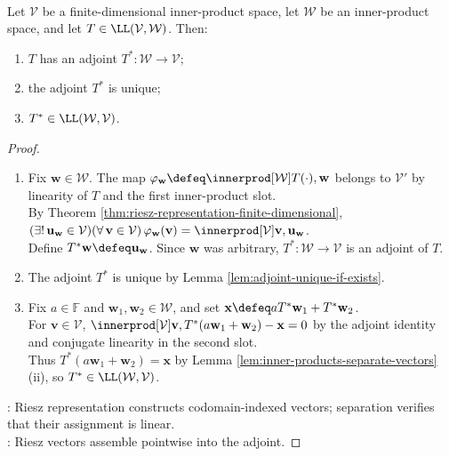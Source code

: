 \begin{theorem} \label{thm:finite-dimensional-adjoint-exists} \\
Let $\mathcal{V}$ be a finite-dimensional inner-product space, let $\mathcal{W}$ be an inner-product space, and let $T\in\LL(\mathcal{V},\mathcal{W})$. Then:
\begin{enumerate}[label=(\roman*)]
\setlength{\itemsep}{0pt}
\item $T$ has an adjoint $T^*:\mathcal{W}\to\mathcal{V}$;
\item the adjoint $T^*$ is unique;
\item $T^*\in\LL(\mathcal{W},\mathcal{V})$.
\end{enumerate}
\begin{proof}
\begin{enumerate}[label=(\roman*)]
\setlength{\itemsep}{0pt}
\item Fix $\mathbf{w}\in\mathcal{W}$. The map $\varphi_{\mathbf{w}}\defeq\innerprod[\mathcal{W}]{T(\cdot),\mathbf{w}}$ belongs to $\mathcal{V}'$ by linearity of $T$ and the first inner-product slot.\\
By Theorem \ref{thm:riesz-representation-finite-dimensional}, $(\exists!\,\mathbf{u}_{\mathbf{w}}\in\mathcal{V})(\forall\,\mathbf{v}\in\mathcal{V})\,\varphi_{\mathbf{w}}(\mathbf{v})=\innerprod[\mathcal{V}]{\mathbf{v},\mathbf{u}_{\mathbf{w}}}$.\\
Define $T^*\mathbf{w}\defeq\mathbf{u}_{\mathbf{w}}$. Since $\mathbf{w}$ was arbitrary, $T^*:\mathcal{W}\to\mathcal{V}$ is an adjoint of $T$.
\item The adjoint $T^*$ is unique by Lemma \ref{lem:adjoint-unique-if-exists}.
\item Fix $a\in\mathbb{F}$ and $\mathbf{w}_1,\mathbf{w}_2\in\mathcal{W}$, and set $\mathbf{x}\defeq aT^*\mathbf{w}_1+T^*\mathbf{w}_2$.\\
For $\mathbf{v}\in\mathcal{V}$, $\innerprod[\mathcal{V}]{\mathbf{v},T^*(a\mathbf{w}_1+\mathbf{w}_2)-\mathbf{x}}=0$ by the adjoint identity and conjugate linearity in the second slot.\\
Thus $T^*(a\mathbf{w}_1+\mathbf{w}_2)=\mathbf{x}$ by Lemma \ref{lem:inner-products-separate-vectors}(ii), so $T^*\in\LL(\mathcal{W},\mathcal{V})$.
\end{enumerate}
: Riesz representation constructs codomain-indexed vectors; separation verifies that their assignment is linear.\\
: Riesz vectors assemble pointwise into the adjoint.
\end{proof}
\end{theorem}

